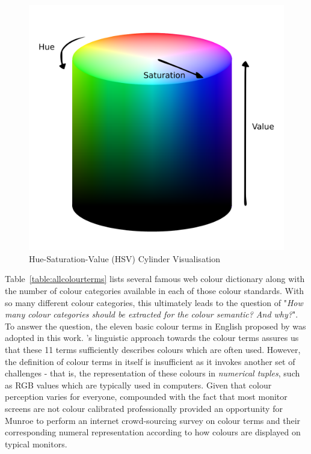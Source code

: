 \begin{figure}[hbt!]\centering
\includegraphics[width=.5\textwidth]{image/general/HSV.png}
\caption{Hue-Saturation-Value (HSV) Cylinder Visualisation}
\label{fig:hsvcylinder}
\end{figure}

Table~\ref{table:allcolourterms} lists several famous web colour dictionary along with the number of colour categories available in each of those colour standards. With so many different colour categories, this ultimately leads to the question of "\textit{How many colour categories should be extracted for the colour semantic? And why?}".
To answer the question, the eleven basic colour terms in English proposed by \cite{berlinandkay} was adopted in this work.
's linguistic approach towards the colour terms assures us that these 11 terms sufficiently describes colours which are often used.
However, the definition of colour terms in itself is insufficient as it invokes another set of challenges - that is, the representation of these colours in \textit{numerical tuples}, such as RGB values which are typically used in computers.
Given that colour perception varies for everyone, compounded with the fact that most monitor screens are not colour calibrated professionally provided an opportunity for Munroe \cite{munroe2010color} to perform an internet crowd-sourcing survey on colour terms and their corresponding numeral representation according to how colours are displayed on typical monitors.

